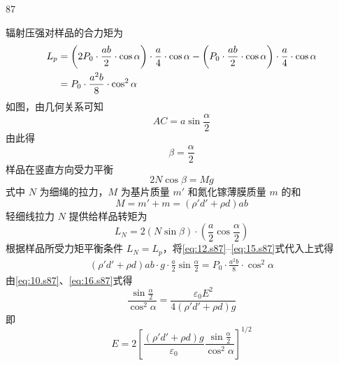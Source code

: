 \begin{solution}{87}
\begin{subsolution}
\begin{subsubsolution}
            辐射压强对样品的合力矩为
            \begin{align}
                L_{p} &= \left(2 P_{0} \cdot \frac{a b}{2} \cdot \cos\alpha\right) \cdot \frac{a}{4} \cdot \cos\alpha - \left(P_{0} \cdot \frac{a b}{2} \cdot \cos\alpha\right) \cdot \frac{a}{4} \cdot \cos\alpha \notag\\
                &= P_{0} \cdot \frac{a^{2} b}{8} \cdot \cos^{2}\alpha
                \label{eq:11.s87}
            \end{align}
            如图，由几何关系可知
            \[
                A C = a \sin\frac{\alpha}{2}
            \]
            由此得
            \begin{equation}
                \beta = \frac{\alpha}{2}
                \label{eq:12.s87}
            \end{equation}
            样品在竖直方向受力平衡
            \begin{equation}
                2 N \cos\beta = M g
                \label{eq:13.s87}
            \end{equation}
            式中 $N$ 为细绳的拉力，$M$ 为基片质量 $m'$ 和氮化镓薄膜质量 $m$ 的和
            \begin{equation}
                M = m' + m = (\rho' d' + \rho d) a b
                \label{eq:14.s87}
            \end{equation}
            轻细线拉力 $N$ 提供给样品转矩为
            \begin{equation}
                L_{N} = 2 (N \sin\beta) \cdot \left(\frac{a}{2} \cos\frac{\alpha}{2}\right)
                \label{eq:15.s87}
            \end{equation}
            根据样品所受力矩平衡条件 $L_{N} = L_{p}$，将\eqref{eq:12.s87}--\eqref{eq:15.s87}式代入上式得
            \begin{align}
                (\rho' d' + \rho d) a b \cdot g \cdot \frac{a}{2} \sin\frac{\alpha}{2} = P_{0} \cdot \frac{a^{2} b}{8} \cdot \cos^{2}\alpha
                \label{eq:16.s87}
            \end{align}
            由\eqref{eq:10.s87}、\eqref{eq:16.s87}式得
            \[
                \frac{\sin\frac{\alpha}{2}}{\cos^{2}\alpha} = \frac{\varepsilon_{0} E^{2}}{4 (\rho' d' + \rho d) g}
            \]
            即
            \begin{equation}
                E = 2 \left[ \frac{(\rho' d' + \rho d) g}{\varepsilon_{0}} \frac{\sin\frac{\alpha}{2}}{\cos^{2}\alpha} \right]^{1/2}
                \label{eq:17.s87}
            \end{equation}

\end{subsubsolution}
\end{subsolution}
\end{solution}

